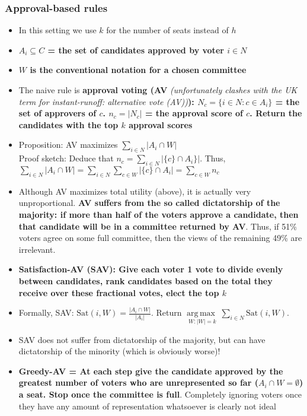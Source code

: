 \documentclass[20pt,a4paper,landscape]{extarticle}
\DeclareMathOperator*{\argmax}{arg\,max\:}
\begin{document}
\begin{flushleft}
\subsubsection{Approval-based rules}
\begin{itemize}
\item In this setting we use $k$ for the number of seats instead of $h$
\item \textbf{$A_i \subseteq C$ = the set of candidates approved by voter $i \in N$}
\item \textbf{$W$ is the conventional notation for a chosen committee}
\item The naive rule is \textbf{approval voting (AV} \textit{(unfortunately clashes with the UK term for instant-runoff: alternative vote (AV))}\textbf{): $N_c = \{i \in N: c \in A_i\}$ = the set of approvers of $c$. $n_c = |N_c|$ = the approval score of $c$. Return the candidates with the top $k$ approval scores}
\item Proposition: AV maximizes $\sum_{i \in N} |A_i \cap W|$\\
Proof sketch: Deduce that $n_c = \sum_{i \in N} |\{c\} \cap A_i\}|$. Thus, $\sum_{i \in N} |A_i \cap W| = \sum_{i \in N} \sum_{c \in W} |\{c\} \cap A_i| = \sum_{c \in W} n_c$
\item Although AV maximizes total utility (above), it is actually very unproportional. \textbf{AV suffers from the so called dictatorship of the majority: if more than half of the voters approve a candidate, then that candidate will be in a committee returned by AV}. Thus, if 51\% voters agree on some full committee, then the views of the remaining 49\% are irrelevant.
\item \textbf{Satisfaction-AV (SAV): Give each voter 1 vote to divide evenly between candidates, rank candidates based on the total they receive over these fractional votes, elect the top $k$}
\item Formally, SAV: $\textrm{Sat}(i, W) = \frac{|A_i \cap W|}{|A_i|}$. Return $\underset{W: |W| = k}{\argmax}\sum_{i \in N}\textrm{Sat}(i, W)$.
\item SAV does not suffer from dictatorship of the majority, but can have dictatorship of the minority (which is obviously worse)!
\clearpage
\item \textbf{Greedy-AV = At each step give the candidate approved by the greatest number of voters who are unrepresented so far ($A_i \cap W = \emptyset$) a seat. Stop once the committee is full}. Completely ignoring voters once they have any amount of representation whatsoever is clearly not ideal

\end{itemize}
\end{flushleft}
\end{document}
